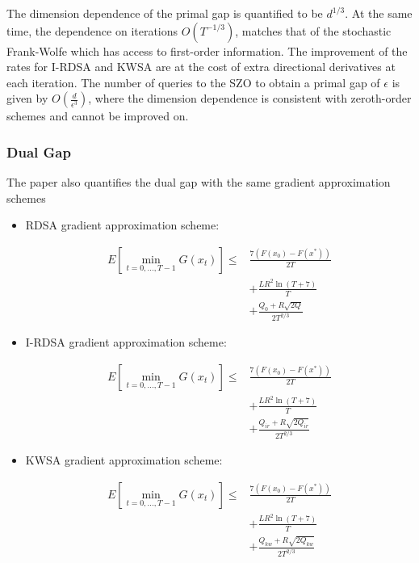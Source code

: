 \documentclass[10pt,twocolumn,letterpaper]{article}
\begin{document}
The dimension dependence of the primal gap is quantified to be
$d^{1 / 3}$. At the same time, the dependence on iterations
$O\left(T^{-1 / 3}\right)$, matches that of the stochastic 
Frank-Wolfe which has access to first-order information. 
The improvement of the rates for I-RDSA and KWSA are at the cost of
extra directional derivatives at each iteration.
The number of queries to the SZO to obtain a primal gap of $\epsilon$ is given by 
$O\left(\frac{d}{\epsilon^{3}}\right)$, where the dimension dependence
is consistent with zeroth-order schemes and cannot be improved on.

\subsubsection{Dual Gap}

The paper also quantifies the dual gap with the same gradient approximation schemes

\begin{itemize}
\item {RDSA gradient approximation scheme:

\[
\begin{aligned}
E\left[\min _{t=0, \ldots, T-1} G\left(x_{t}\right)\right] \leq & \frac{7\left(F\left(x_{0}\right)-F\left(x^{*}\right)\right)}{2 T} \\
& +\frac{L R^{2} \ln (T+7)}{T} \\
& +\frac{Q_{0}+R \sqrt{2 Q}}{2 T^{2 / 3}}
\end{aligned}
\]
}

\item {I-RDSA gradient approximation scheme:

\[
\begin{aligned}
E\left[\min _{t=0, \ldots, T-1} G\left(x_{t}\right)\right] \leq & \frac{7\left(F\left(x_{0}\right)-F\left(x^{*}\right)\right)}{2 T} \\
& +\frac{L R^{2} \ln (T+7)}{T} \\
& +\frac{Q_{i r}+R \sqrt{2 Q_{i r}}}{2 T^{2 / 3}}
\end{aligned}
\]
}

\item {KWSA gradient approximation scheme:

\[
\begin{aligned}
E\left[\min _{t=0, \ldots, T-1} G\left(x_{t}\right)\right] \leq & \frac{7\left(F\left(x_{0}\right)-F\left(x^{*}\right)\right)}{2 T} \\
& +\frac{L R^{2} \ln (T+7)}{T} \\
& +\frac{Q_{k w}+R \sqrt{2 Q_{k w}}}{2 T^{2 / 3}}
\end{aligned}
\]
}

\end{itemize}
\end{document}
